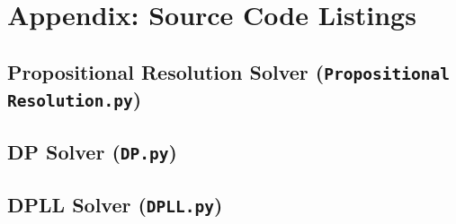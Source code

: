\documentclass[11pt, a4paper]{article}
\begin{document}
\printbibliography

\appendix
\section{Appendix: Source Code Listings}

\subsection{Propositional Resolution Solver (\texttt{Propositional Resolution.py})} \label{app:resolution}


\subsection{DP Solver (\texttt{DP.py})} \label{app:dp}


\subsection{DPLL Solver (\texttt{DPLL.py})} \label{app:dpll}


\end{document}
